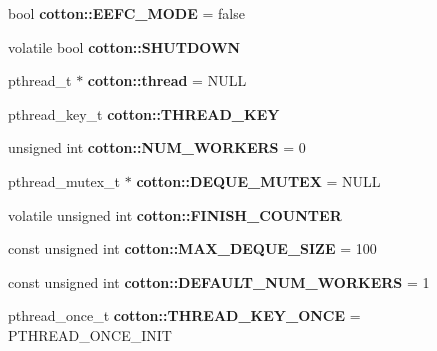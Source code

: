 \begin{DoxyCompactItemize}
\item 
\mbox{\label{cotton-runtime_8h_a096f85b6b6bdb5108f8534037c15e139}} 
bool {\bfseries cotton\+::\+E\+E\+F\+C\+\_\+\+M\+O\+DE} = false
\item 
\mbox{\label{cotton-runtime_8h_ad72043de8ba79ff3385abd67fd1b15bf}} 
volatile bool {\bfseries cotton\+::\+S\+H\+U\+T\+D\+O\+WN}
\item 
\mbox{\label{cotton-runtime_8h_ae1c243496d4cac35fb6d8fb6be14b0f3}} 
pthread\+\_\+t $\ast$ {\bfseries cotton\+::thread} = N\+U\+LL
\item 
\mbox{\label{cotton-runtime_8h_a41bafde742c3ac2e3f360be9a8b2926d}} 
pthread\+\_\+key\+\_\+t {\bfseries cotton\+::\+T\+H\+R\+E\+A\+D\+\_\+\+K\+EY}
\item 
\mbox{\label{cotton-runtime_8h_a0d692d5b7c9fbd1d4999ed8270ebcce0}} 
unsigned int {\bfseries cotton\+::\+N\+U\+M\+\_\+\+W\+O\+R\+K\+E\+RS} = 0
\item 
\mbox{\label{cotton-runtime_8h_a71daeb136715fb167bda82ac84373091}} 
pthread\+\_\+mutex\+\_\+t $\ast$ {\bfseries cotton\+::\+D\+E\+Q\+U\+E\+\_\+\+M\+U\+T\+EX} = N\+U\+LL
\item 
\mbox{\label{cotton-runtime_8h_a8c3fa2e0febd6194c6c2e1b8274e3b6a}} 
volatile unsigned int {\bfseries cotton\+::\+F\+I\+N\+I\+S\+H\+\_\+\+C\+O\+U\+N\+T\+ER}
\item 
\mbox{\label{cotton-runtime_8h_abc469e68d18d644b538f6f16335fb5c4}} 
const unsigned int {\bfseries cotton\+::\+M\+A\+X\+\_\+\+D\+E\+Q\+U\+E\+\_\+\+S\+I\+ZE} = 100
\item 
\mbox{\label{cotton-runtime_8h_a261cb084089447eb9c2bab5c95891795}} 
const unsigned int {\bfseries cotton\+::\+D\+E\+F\+A\+U\+L\+T\+\_\+\+N\+U\+M\+\_\+\+W\+O\+R\+K\+E\+RS} = 1
\item 
\mbox{\label{cotton-runtime_8h_a49aaf0b0bc093f68bcc20907ff338827}} 
pthread\+\_\+once\+\_\+t {\bfseries cotton\+::\+T\+H\+R\+E\+A\+D\+\_\+\+K\+E\+Y\+\_\+\+O\+N\+CE} = P\+T\+H\+R\+E\+A\+D\+\_\+\+O\+N\+C\+E\+\_\+\+I\+N\+IT

\end{DoxyCompactItemize}

